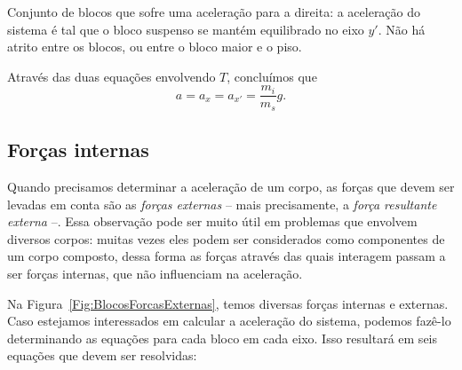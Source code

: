 \begin{marginfigure}[-10cm]
\caption{Conjunto de blocos que sofre uma aceleração para a direita: a aceleração do sistema é tal que o bloco suspenso se mantém equilibrado no eixo $y'$. Não há atrito entre os blocos, ou entre o bloco maior e o piso. \label{Fig:BlocoSuspensoAcelerado}}
\end{marginfigure}

\noindent{}Através das duas equações envolvendo $T$, concluímos que
\begin{equation}
    a = a_x = a_{x'}= \frac{m_i}{m_s} g.
\end{equation}

\subsection{Forças internas}

Quando precisamos determinar a aceleração de um corpo, as forças que devem ser levadas em conta são as \emph{forças externas} -- mais precisamente, a \emph{força resultante externa} --. Essa observação pode ser muito útil em problemas que envolvem diversos corpos: muitas vezes eles podem ser considerados como componentes de um corpo composto, dessa forma as forças através das quais interagem passam a ser forças internas, que não influenciam na aceleração.

Na Figura~\ref{Fig:BlocosForcasExternas}, temos diversas forças internas e externas. Caso estejamos interessados em calcular a aceleração do sistema, podemos fazê-lo determinando as equações para cada bloco em cada eixo. Isso resultará em seis equações que devem ser resolvidas:

